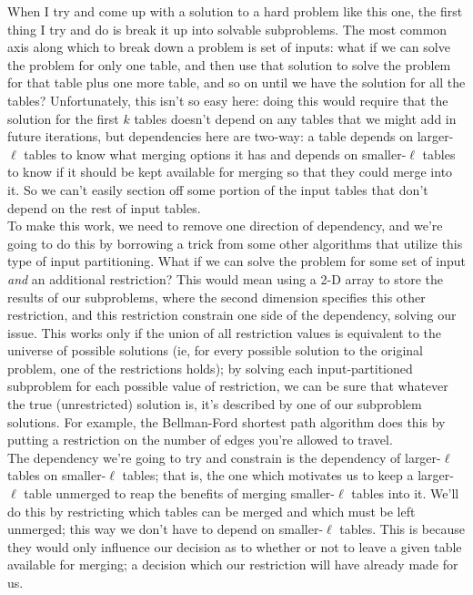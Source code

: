 \documentclass{article}[12]
\begin{document}
When I try and come up with a solution to a hard problem like this one, the first thing I try and do is break it up into solvable subproblems. The most common axis along which to break down a problem is set of inputs: what if we can solve the problem for only one table, and then use that solution to solve the problem for that table plus one more table, and so on until we have the solution for all the tables? Unfortunately, this isn't so easy here: doing this would require that the solution for the first $k$ tables doesn't depend on any tables that we might add in future iterations, but dependencies here are two-way: a table depends on larger-$\ell$ tables to know what merging options it has and depends on smaller-$\ell$ tables to know if it should be kept available for merging so that they could merge into it. So we can't easily section off some portion of the input tables that don't depend on the rest of input tables.\\

To make this work, we need to remove one direction of dependency, and we're going to do this by borrowing a trick from some other algorithms that utilize this type of input partitioning. What if we can solve the problem for some set of input \textit{and} an additional restriction? This would mean using a 2-D array to store the results of our subproblems, where the second dimension specifies this other restriction, and this restriction constrain one side of the dependency, solving our issue. This works only if the union of all restriction values is equivalent to the universe of possible solutions (ie, for every possible solution to the original problem, one of the restrictions holds); by solving each input-partitioned subproblem for each possible value of restriction, we can be sure that whatever the true (unrestricted) solution is, it's described by one of our subproblem solutions. For example, the Bellman-Ford shortest path algorithm does this by putting a restriction on the number of edges you're allowed to travel.\\

The dependency we're going to try and constrain is the dependency of larger-$\ell$ tables on smaller-$\ell$ tables; that is, the one which motivates us to keep a larger-$\ell$ table unmerged to reap the benefits of merging smaller-$\ell$ tables into it. We'll do this by restricting which tables can be merged and which must be left unmerged; this way we don't have to depend on smaller-$\ell$ tables. This is because they would only influence our decision as to whether or not to leave a given table available for merging; a decision which our restriction will have already made for us.\\
\end{document}
